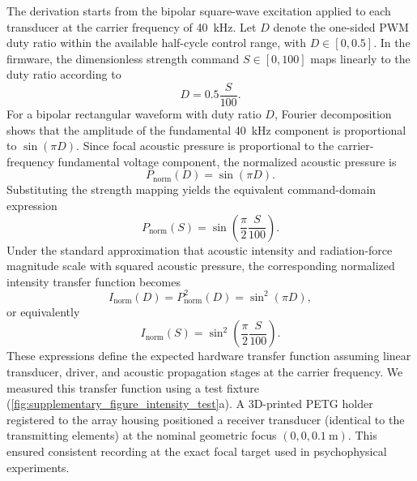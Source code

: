 \documentclass[pdflatex, sn-nature]{sn-jnl}
\theoremstyle{thmstyleone}%
\theoremstyle{thmstyletwo}%
\theoremstyle{thmstylethree}%
\begin{document}
The derivation starts from the bipolar square-wave excitation applied to each transducer at the carrier frequency of \qty{40}{\kilo\hertz}. Let $D$ denote the one-sided PWM duty ratio within the available half-cycle control range, with $D \in [0,0.5]$. In the firmware, the dimensionless strength command $S \in [0,100]$ maps linearly to the duty ratio according to
\begin{equation}
    D = 0.5\frac{S}{100}.
\end{equation}
For a bipolar rectangular waveform with duty ratio $D$, Fourier decomposition shows that the amplitude of the fundamental \qty{40}{\kilo\hertz} component is proportional to $\sin(\pi D)$. Since focal acoustic pressure is proportional to the carrier-frequency fundamental voltage component, the normalized acoustic pressure is
\begin{equation}
    P_{\mathrm{norm}}(D) = \sin(\pi D).
\end{equation}
Substituting the strength mapping yields the equivalent command-domain expression
\begin{equation}
    P_{\mathrm{norm}}(S) = \sin\!\left(\frac{\pi}{2}\frac{S}{100}\right).
\end{equation}
Under the standard approximation that acoustic intensity and radiation-force magnitude scale with squared acoustic pressure, the corresponding normalized intensity transfer function becomes
\begin{equation}
    I_{\mathrm{norm}}(D) = P_{\mathrm{norm}}^2(D) = \sin^2(\pi D),
\end{equation}
or equivalently
\begin{equation}
    I_{\mathrm{norm}}(S) = \sin^2\!\left(\frac{\pi}{2}\frac{S}{100}\right).
\end{equation}
These expressions define the expected hardware transfer function assuming linear transducer, driver, and acoustic propagation stages at the carrier frequency. We measured this transfer function using a test fixture (\cref{fig:supplementary_figure_intensity_test}a). A 3D-printed PETG holder registered to the array housing positioned a receiver transducer (identical to the transmitting elements) at the nominal geometric focus $(0,0,\qty{0.1}{\meter})$. This ensured consistent recording at the exact focal target used in psychophysical experiments.
\end{document}
